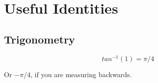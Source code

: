 \section{Useful Identities}

\subsection{Trigonometry}

\begin{equation}
    tan^{-1} (1) = \pi / 4
\end{equation}

Or $-\pi / 4$, if you are measuring backwards.